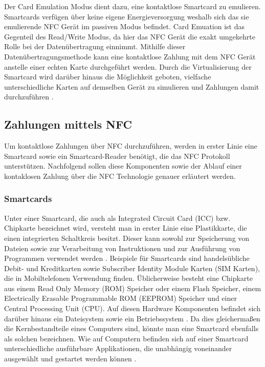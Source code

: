 Der Card Emulation Modus dient dazu, eine kontaktlose Smartcard zu emulieren. Smartcards verfügen über keine eigene Energieversorgung weshalb sich das sie emulierende NFC Gerät im passiven Modus befindet. Card Emuation ist das Gegenteil des Read/Write Modus, da hier das NFC Gerät die exakt umgekehrte Rolle bei der Datenübertragung einnimmt. Mithilfe dieser Datenübertragungsmethode kann eine kontaktlose Zahlung mit dem NFC Gerät anstelle einer echten Karte durchgeführt werden. Durch die Virtualisierung der Smartcard wird darüber hinaus die Möglichkeit geboten, vielfache unterschiedliche Karten auf demselben Gerät zu simulieren und Zahlungen damit durchzuführen \cite{Madlmayr2014}. 

\subsection{Zahlungen mittels NFC}

Um kontaktlose Zahlungen über NFC durchzuführen, werden in erster Linie eine Smartcard sowie ein Smartcard-Reader benötigt, die das NFC Protokoll unterstützen. Nachfolgend sollen diese Komponenten sowie der Ablauf einer kontaklosen Zahlung über die NFC Technologie genauer erläutert werden. 

\subsubsection{Smartcards}

  Unter einer Smartcard, die auch als Integrated Circuit Card (ICC) bzw. Chipkarte bezeichnet wird, versteht man in erster Linie eine Plastikkarte, die einen integrierten Schaltkreis besitzt. Dieser kann sowohl zur Speicherung von Dateien sowie zur Verarbeitung von Instruktionen und zur Ausführung von Programmen verwendet werden \cite{lexikonSmartcard}. Beispiele für Smartcards sind handelsübliche Debit- und Kreditkarten sowie Subscriber Identity Module Karten (SIM Karten), die in Mobiltelefonen Verwendung finden. 
  Üblicherweise besteht eine Chipkarte aus einem Read Only Memory (ROM) Speicher oder einem Flash Speicher, einem Electrically Erasable Programmable ROM (EEPROM) Speicher und einer Central Processing Unit (CPU). Auf diesen Hardware Komponenten befindet sich darüber hinaus ein Dateisystem sowie ein Betriebssystem \cite{smartcasedElectricity}. Da dies gleichermaßen die Kernbestandteile eines Computers sind, könnte man eine Smartcard 
  ebenfalls als solchen bezeichnen. 
  Wie auf Computern befinden sich auf einer Smartcard unterschiedliche ausführbare Applikationen, die unabhängig voneinander ausgewählt und gestartet werden können \cite{smartcasedElectricity}. 
  
